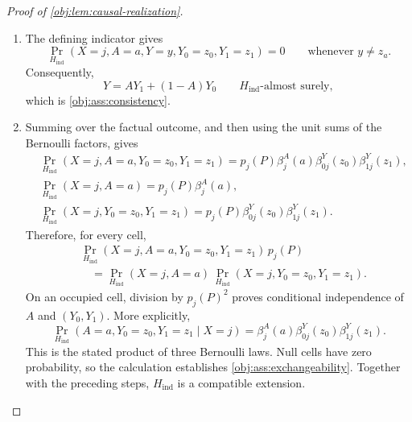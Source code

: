 \documentclass[11pt]{article}
\begin{document}
\begin{proof}[Proof of \cref{obj:lem:causal-realization}]
\begin{enumerate}
The propensity weights reconstruct the treatment--covariate masses:
\[
p_j(P)\beta^A_j(a)=s_{aj}(P).
\]
For \(p_j(P)=0\), nonnegativity and
\(s_{0j}(P)+s_{1j}(P)=0\) give both arm masses zero. For
\(p_j(P)>0\), the two identities are
\[
p_j(P)e_j(P)=s_{1j}(P),\qquad
p_j(P)\{1-e_j(P)\}=p_j(P)-s_{1j}(P)=s_{0j}(P).
\]
Likewise,
\[
s_{aj}(P)\beta^Y_{aj}(y)=P(X=j,A=a,Y=y).
\]
If \(s_{aj}(P)=0\), both observed outcome atoms vanish. If
\(s_{aj}(P)>0\), the identities for success and failure are
\begingroup\small
\[
s_{aj}(P)\mu_{aj}(P)=q_{aj}(P),\qquad
s_{aj}(P)\{1-\mu_{aj}(P)\}
=s_{aj}(P)-q_{aj}(P)
=P(X=j,A=a,Y=0).
\]
\endgroup
Combining these calculations proves
\[
\Pr_{H_{\mathrm{ind}}}(X=j,A=a,Y=y)
=P(X=j,A=a,Y=y).
\]
Equality at every atom proves equality of the observed marginal with
\(P\), and in particular
\[
\Pr_{H_{\mathrm{ind}}}(X=j)=p_j(P).
\]

\item
The defining indicator gives
\[
\Pr_{H_{\mathrm{ind}}}
 (X=j,A=a,Y=y,Y_0=z_0,Y_1=z_1)=0
\qquad\text{whenever }y\ne z_a.
\]
Consequently,
\[
Y=AY_1+(1-A)Y_0
\qquad H_{\mathrm{ind}}\text{-almost surely},
\]
which is \cref{obj:ass:consistency}.

\item
Summing over the factual outcome, and then using the unit sums of the
Bernoulli factors, gives
\[
\begin{aligned}
&\Pr_{H_{\mathrm{ind}}}(X=j,A=a,Y_0=z_0,Y_1=z_1)
=p_j(P)\beta^A_j(a)\beta^Y_{0j}(z_0)\beta^Y_{1j}(z_1),\\
&\Pr_{H_{\mathrm{ind}}}(X=j,A=a)=p_j(P)\beta^A_j(a),\\
&\Pr_{H_{\mathrm{ind}}}(X=j,Y_0=z_0,Y_1=z_1)
=p_j(P)\beta^Y_{0j}(z_0)\beta^Y_{1j}(z_1).
\end{aligned}
\]
Therefore, for every cell,
\[
\begin{aligned}
&\Pr_{H_{\mathrm{ind}}}(X=j,A=a,Y_0=z_0,Y_1=z_1)\,p_j(P)\\
&\quad=
\Pr_{H_{\mathrm{ind}}}(X=j,A=a)\,
\Pr_{H_{\mathrm{ind}}}(X=j,Y_0=z_0,Y_1=z_1).
\end{aligned}
\]
On an occupied cell, division by \(p_j(P)^2\) proves conditional
independence of \(A\) and \((Y_0,Y_1)\). More explicitly,
\[
\Pr_{H_{\mathrm{ind}}}
 (A=a,Y_0=z_0,Y_1=z_1\mid X=j)
=\beta^A_j(a)\beta^Y_{0j}(z_0)\beta^Y_{1j}(z_1).
\]
This is the stated product of three Bernoulli laws. Null cells have
zero probability, so the calculation establishes
\cref{obj:ass:exchangeability}. Together with the preceding steps,
\(H_{\mathrm{ind}}\) is a compatible extension.


\end{enumerate}
\end{proof}
\end{document}
